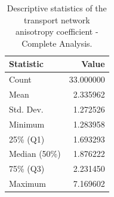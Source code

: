 \begin{table}[htbp]
\caption{Descriptive statistics of the transport network anisotropy coefficient - Complete Analysis.}
\label{tab:stats_anisotropy_updated}
\begin{tabular}{lr}
\toprule
Statistic & Value \\
\midrule
Count & 33.000000 \\
Mean & 2.335962 \\
Std. Dev. & 1.272526 \\
Minimum & 1.283958 \\
25\% (Q1) & 1.693293 \\
Median (50\%) & 1.876222 \\
75\% (Q3) & 2.231450 \\
Maximum & 7.169602 \\
\bottomrule
\end{tabular}
\end{table}
